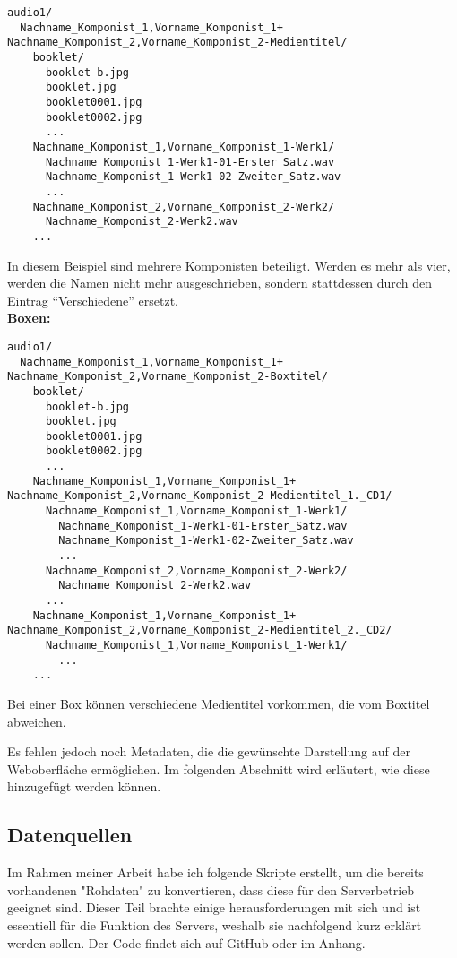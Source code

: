 \documentclass[12pt,a4paper]{report}
\begin{document}
  \begin{verbatim}
audio1/
  Nachname_Komponist_1,Vorname_Komponist_1+ Nachname_Komponist_2,Vorname_Komponist_2-Medientitel/
    booklet/
      booklet-b.jpg
      booklet.jpg
      booklet0001.jpg
      booklet0002.jpg
      ...
    Nachname_Komponist_1,Vorname_Komponist_1-Werk1/
      Nachname_Komponist_1-Werk1-01-Erster_Satz.wav
      Nachname_Komponist_1-Werk1-02-Zweiter_Satz.wav
      ...
    Nachname_Komponist_2,Vorname_Komponist_2-Werk2/
      Nachname_Komponist_2-Werk2.wav
    ...
  \end{verbatim}

  In diesem Beispiel sind mehrere Komponisten beteiligt. 
  Werden es mehr als vier, werden die Namen nicht mehr ausgeschrieben, 
  sondern stattdessen durch den Eintrag \enquote{Verschiedene} ersetzt.
  \\
  \newline
  \textbf{Boxen:}

  \begin{verbatim}
audio1/
  Nachname_Komponist_1,Vorname_Komponist_1+ Nachname_Komponist_2,Vorname_Komponist_2-Boxtitel/
    booklet/
      booklet-b.jpg
      booklet.jpg
      booklet0001.jpg
      booklet0002.jpg
      ...
    Nachname_Komponist_1,Vorname_Komponist_1+ Nachname_Komponist_2,Vorname_Komponist_2-Medientitel_1._CD1/
      Nachname_Komponist_1,Vorname_Komponist_1-Werk1/
        Nachname_Komponist_1-Werk1-01-Erster_Satz.wav
        Nachname_Komponist_1-Werk1-02-Zweiter_Satz.wav
        ...
      Nachname_Komponist_2,Vorname_Komponist_2-Werk2/
        Nachname_Komponist_2-Werk2.wav
      ...
    Nachname_Komponist_1,Vorname_Komponist_1+ Nachname_Komponist_2,Vorname_Komponist_2-Medientitel_2._CD2/ 
      Nachname_Komponist_1,Vorname_Komponist_1-Werk1/
        ...
    ...
  \end{verbatim}

  Bei einer Box können verschiedene Medientitel vorkommen, die vom Boxtitel abweichen.

  Es fehlen jedoch noch Metadaten, die die gewünschte Darstellung auf der Weboberfläche ermöglichen.
  Im folgenden Abschnitt wird erläutert, wie diese hinzugefügt werden können.
  
  \subsection{Datenquellen}
  Im Rahmen meiner Arbeit habe ich folgende Skripte erstellt, um die bereits vorhandenen "Rohdaten" zu konvertieren,
  dass diese für den Serverbetrieb geeignet sind. Dieser Teil brachte einige herausforderungen mit sich 
  und ist essentiell für die Funktion des Servers, weshalb sie nachfolgend kurz erklärt werden sollen.
  Der Code findet sich auf GitHub oder im Anhang.
\end{document}
